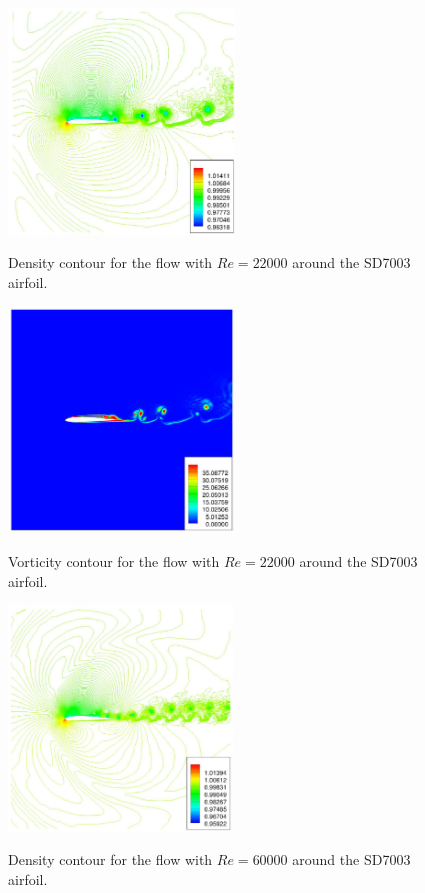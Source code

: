 \begin{figure}
\centering
\includegraphics[height=60mm]{figure_936a} \\
\caption{Density contour for the flow with $Re = 22000$ around the SD7003 airfoil.}
\label{fig:figure_936a}
\end{figure}

\begin{figure}
\centering
\includegraphics[height=60mm]{figure_936b} \\
\caption{Vorticity contour for the flow with $Re = 22000$ around the SD7003 airfoil.}
\label{fig:figure_936b}
\end{figure}

\begin{figure}
\centering
\includegraphics[height=60mm]{figure_937a} \\
\caption{Density contour for the flow with $Re = 60000$ around the SD7003 airfoil.}
\label{fig:figure_937a}
\end{figure}

